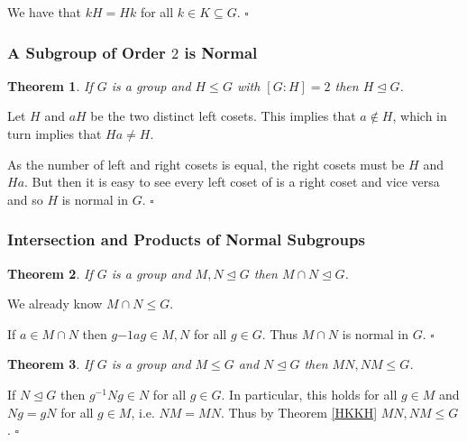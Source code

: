 \documentclass[10pt]{article}
\newtheorem{theorem}{Theorem}[section]
\newenvironment{proof}[1][Proof]{\begin{trivlist}
\item[\hskip \labelsep {\itshape #1}]}{\end{trivlist}}
\begin{document}
\begin{proof}
We have that $kH = Hk$ for all $k \in K \subseteq G$. $\square$
\end{proof}

\subsubsection{A Subgroup of Order $2$ is Normal}

\begin{theorem}
If $G$ is a group and $H \leq G$ with $[G:H] = 2$ then $H \mathrel{\unlhd} G$.
\end{theorem}

\begin{proof}
Let $H$ and $aH$ be the two distinct left cosets. This implies that $a \notin H$, which in turn implies that $Ha \neq H$.

As the number of left and right cosets is equal, the right cosets must be $H$ and $Ha$. But then it is easy to see every left coset of is a right coset and vice versa and so $H$ is normal in $G$. $\square$
\end{proof}

\subsubsection{Intersection and Products of Normal Subgroups}

\begin{theorem}
If $G$ is a group and $M, N \mathrel{\unlhd} G$ then $M \cap N \mathrel{\unlhd} G$.
\end{theorem}

\begin{proof}
We already know $M \cap N \leq G$. 

If $a \in M \cap N$ then $g{-1}ag \in M, N$ for all $g \in G$. Thus $M \cap N$ is normal in $G$. $\square$
\end{proof}

\begin{theorem}
If $G$ is a group and $M \leq G$ and $N \mathrel{\unlhd} G$ then $MN, NM \leq G$.
\end{theorem}

\begin{proof}
If $N \mathrel{\unlhd} G$ then $g^{-1}Ng \in N$ for all $g \in G$. In particular, this holds for all $g \in M$ and $Ng = gN$ for all $g \in M$, i.e. $NM = MN$. Thus by Theorem \ref{HKKH} $MN, NM \leq G$. $\square$
\end{proof}
\end{document}
